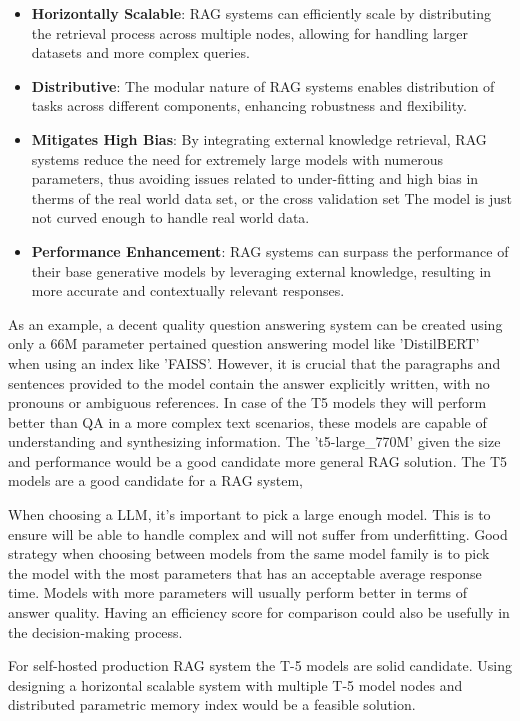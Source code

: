 \documentclass{wseas}
\begin{document}
\begin{itemize}

\item
  \textbf{Horizontally Scalable}: RAG systems can efficiently scale by
  distributing the retrieval process across multiple nodes, allowing for
  handling larger datasets and more complex queries.
\item
  \textbf{Distributive}: The modular nature of RAG systems enables
  distribution of tasks across different components, enhancing
  robustness and flexibility.
\item
  \textbf{Mitigates High Bias}: By integrating external knowledge
  retrieval, RAG systems reduce the need for extremely large models with
  numerous parameters, thus avoiding issues related to under-fitting and
  high bias in therms of the real world data set, or the cross
  validation set The model is just not curved enough to handle real
  world data.
\item
  \textbf{Performance Enhancement}: RAG systems can surpass the
  performance of their base generative models by leveraging external
  knowledge, resulting in more accurate and contextually relevant
  responses.
\end{itemize}

As an example, a decent quality question answering system can be created
using only a 66M parameter pertained question answering model like
'DistilBERT' when using an index like 'FAISS'. However, it is crucial that
the paragraphs and sentences provided to the model contain the answer
explicitly written, with no pronouns or ambiguous references. In case of
the T5 models they will perform better than QA in a more complex text
scenarios, these models are capable of understanding and synthesizing
information. The 't5-large\_770M' given the size and performance would be
a good candidate more general RAG solution. The T5 models are a good candidate for a RAG system,

When choosing a LLM, it's important to pick a large enough model. 
This is to ensure will be able to handle complex and will not suffer from underfitting. 
Good strategy when choosing between models from
the same model family is to pick the model with the most parameters 
that has an acceptable average response time. Models with more parameters will 
usually perform better in terms of answer quality. Having an efficiency score for 
comparison could also be usefully in the decision-making process.

For self-hosted production RAG system the T-5 models 
are solid candidate. Using designing a horizontal scalable system with
multiple T-5 model nodes and distributed parametric memory index would be
a feasible solution.
\end{document}
